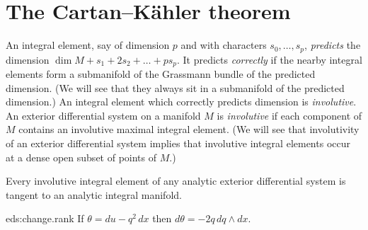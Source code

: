 \section{\texorpdfstring{The Cartan--K\"ahler theorem}{The Cartan--Kaehler theorem}}
An integral element, say of dimension \(p\) and with characters \(s_0,\dots,s_p\), \emph{predicts} the dimension \(\dim M + s_1+2s_2+\dots+ps_p\).
It predicts \emph{correctly} if the nearby integral elements form a submanifold of the Grassmann bundle of the predicted dimension.
(We will see that they always sit in a submanifold of the predicted dimension.)
An integral element which correctly predicts dimension is \emph{involutive}.
An exterior differential system on a manifold \(M\) is \emph{involutive} if each component of \(M\) contains an involutive maximal integral element.
(We will see that involutivity of an exterior differential system implies that involutive integral elements occur at a dense open subset of points of \(M\).)
\begin{theorem}\label{theorem:CK}
Every involutive integral element of any analytic exterior differential system is tangent to an analytic integral manifold.
\end{theorem}
\begin{answer}{eds:change.rank}
If \(\theta=du-q^2 \, dx\) then \(d\theta = - 2q \, dq \wedge dx\).
\end{answer}

